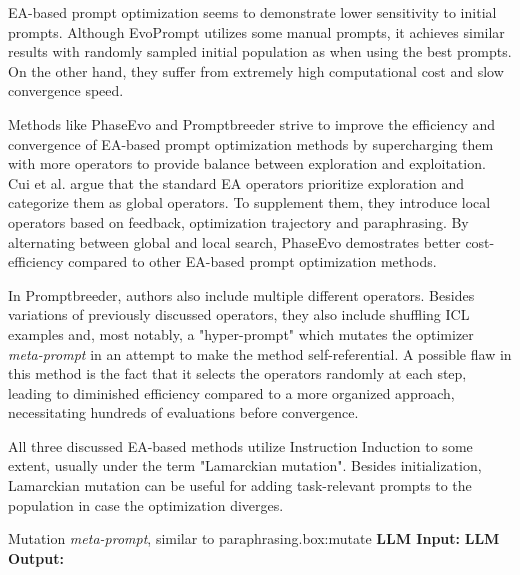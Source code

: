 EA-based prompt optimization seems to demonstrate lower sensitivity to initial prompts. Although EvoPrompt utilizes some manual prompts,
it achieves similar results with randomly sampled initial population as when using the best prompts\cite{guo2024connectinglargelanguagemodels}.
On the other hand, they suffer from extremely high computational cost and slow convergence speed\cite{cui2024phaseevounifiedincontextprompt}.

Methods like PhaseEvo\cite{cui2024phaseevounifiedincontextprompt} and Promptbreeder\cite{fernando2023promptbreederselfreferentialselfimprovementprompt} strive to
improve the efficiency and convergence of EA-based prompt optimization methods by supercharging them with more operators to provide balance between exploration and exploitation.
Cui et al.\cite{cui2024phaseevounifiedincontextprompt} argue that the standard EA operators prioritize exploration and categorize them as global operators.
To supplement them, they introduce local operators based on feedback, optimization trajectory and paraphrasing. By alternating between global and local 
search, PhaseEvo demostrates better cost-efficiency compared to other EA-based prompt optimization methods\cite{cui2024phaseevounifiedincontextprompt}. 

In Promptbreeder\cite{fernando2023promptbreederselfreferentialselfimprovementprompt}, authors also include multiple different operators.
Besides variations of previously discussed operators, they also include shuffling ICL examples and, most notably, a "hyper-prompt" which mutates 
the optimizer \textit{meta-prompt} in an attempt to make the method self-referential. A possible flaw in this method is the fact that it
selects the operators randomly at each step, leading to diminished efficiency compared to a more organized approach\cite{cui2024phaseevounifiedincontextprompt}, 
necessitating hundreds of evaluations before convergence\cite{wan2024teachbettersmarterinstructions}.

All three discussed EA-based methods utilize Instruction Induction\cite{honovich2022instructioninductionexamplesnatural} to some extent, usually under the term "Lamarckian mutation". 
Besides initialization, Lamarckian mutation can be useful for adding task-relevant prompts to the population in case the optimization diverges\cite{fernando2023promptbreederselfreferentialselfimprovementprompt}. 

\begin{figurebox}{Mutation \textit{meta-prompt}, similar to paraphrasing.}{box:mutate}
    \textbf{LLM Input:} 
    \textbf{LLM Output:} 
\end{figurebox}

